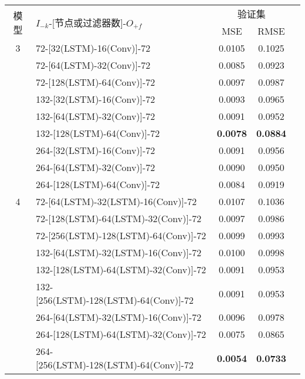 \begin{table}[!htbp]
  \centering
  \label{tab:ss_area_out_72}
  \footnotesize
  \renewcommand{\arraystretch}{1}
  \begin{tabular}{clccc}
    \toprule
    \multirow{2}{*}{模型} & \multirow{2}{*}{$I_{-k}$-[节点或过滤器数]-$O_{+f}$} & \multicolumn{2}{c}{验证集}\\
    \cmidrule(lr){3-4}
    \noalign{\smallskip}
    & & MSE & RMSE\\
    \midrule 
    3 & 72-[32(LSTM)-16(Conv)]-72 & 0.0105 & 0.1025 \\ 
      & 72-[64(LSTM)-32(Conv)]-72 & 0.0085 & 0.0923 \\
      & 72-[128(LSTM)-64(Conv)]-72 & 0.0097 & 0.0987 \\
      & 132-[32(LSTM)-16(Conv)]-72 & 0.0093 & 0.0965 \\
      & 132-[64(LSTM)-32(Conv)]-72 & 0.0091 & 0.0952 \\
      & 132-[128(LSTM)-64(Conv)]-72 & \textbf{0.0078} & \textbf{0.0884} \\
      & 264-[32(LSTM)-16(Conv)]-72 & 0.0091 & 0.0956 \\
      & 264-[64(LSTM)-32(Conv)]-72 & 0.0090 & 0.0950 \\
      & 264-[128(LSTM)-64(Conv)]-72 & 0.0084 & 0.0919 \\
    \hline
    4 & 72-[64(LSTM)-32(LSTM)-16(Conv)]-72 & 0.0107 & 0.1036 \\
      & 72-[128(LSTM)-64(LSTM)-32(Conv)]-72 & 0.0097 & 0.0986 \\
      & 72-[256(LSTM)-128(LSTM)-64(Conv)]-72 & 0.0099 & 0.0993 \\
      & 132-[64(LSTM)-32(LSTM)-16(Conv)]-72 & 0.0100 & 0.0998 \\
      & 132-[128(LSTM)-64(LSTM)-32(Conv)]-72 & 0.0091 & 0.0953 \\
      & 132-[256(LSTM)-128(LSTM)-64(Conv)]-72 & 0.0091 & 0.0953\\
      & 264-[64(LSTM)-32(LSTM)-16(Conv)]-72 & 0.0096 & 0.0978 \\
      & 264-[128(LSTM)-64(LSTM)-32(Conv)]-72 & 0.0075 & 0.0865 \\
      & 264-[256(LSTM)-128(LSTM)-64(Conv)]-72 & \textbf{0.0054} & \textbf{0.0733} \\
    \hline

\end{tabular}
\end{table}
